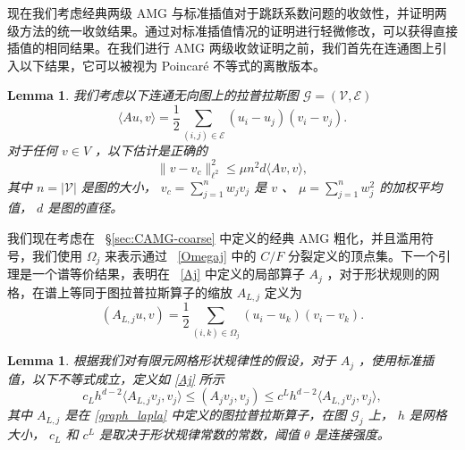 \documentclass[12pt]{acta_2011xz}
\newtheorem{lemma}[theorem]{Lemma}
\begin{document}
现在我们考虑经典两级 AMG 与标准插值对于跳跃系数问题的收敛性，并证明两级方法的统一收敛结果。通过对标准插值情况的证明进行轻微修改，可以获得直接插值的相同结果。在我们进行 AMG 两级收敛证明之前，我们首先在连通图上引入以下结果，它可以被视为 Poincar\'{e} 不等式的离散版本。
   \begin{lemma}   \label{lem:discrete_poincare}    我们考虑以下连通无向图上的拉普拉斯图    $\mathcal{G}=(\mathcal{V}, \mathcal{E})$    
   \begin{equation}\label{graph_lapla}
        \langle Au, v\rangle = \frac{1}{2}\sum_{(i,j)\in \mathcal{E}}(u_i-u_j)(v_i-v_j).
    \end{equation}    对于任何    $v\in V$    ，以下估计是正确的
   \begin{equation}
        \|v-v_c\|_{\ell^2}^2\le \mu n^2d\langle Av, v\rangle,
    \end{equation}    其中    $n=|\mathcal V|$    是图的大小，   $v_c=\sum_{j=1}^{n}w_jv_j$    是    $v$   、   $\mu=\sum_{j=1}^nw_j^2$    的加权平均值，   $d$    是图的直径。  \end{lemma}     

我们现在考虑在~    \S       \ref{sec:CAMG-coarse}    中定义的经典 AMG 粗化，并且滥用符号，我们使用
   $\Omega_j$    来表示通过~    \eqref{Omegaj}    中的    $C/F$    分裂定义的顶点集。下一个引理是一个谱等价结果，表明在~    \eqref{Aj}    中定义的局部算子    $A_j$    ，对于形状规则的网格，在谱上等同于图拉普拉斯算子的缩放
   $A_{L,j}$    定义为
   \begin{equation}\label{e:ALj}
(A_{L,j} u,v) = \frac12 \sum_{(i,k)\in \Omega_j} (u_i-u_k)(v_i-v_k). 
\end{equation}    
   \begin{lemma}   \label{lem:shape_reg}    根据我们对有限元网格形状规律性的假设，对于    $A_j$    ，使用标准插值，以下不等式成立，定义如    \eqref{Aj}    所示
   \begin{equation}
                c_Lh^{d-2}\langle A_{L,j} v_j, v_j\rangle \le ( A_jv_j, v_j) \le c^Lh^{d-2} \langle A_{L,j} v_j, v_j\rangle,
            \end{equation}    其中    $A_{L,j}$    是在    \eqref{graph_lapla}    中定义的图拉普拉斯算子，在图    $\mathcal G_j$    上，   $h$    是网格大小，   $c_L$    和    $c^L$    是取决于形状规律常数的常数，阈值    $\theta$    是连接强度。  \end{lemma}     
\end{document}
